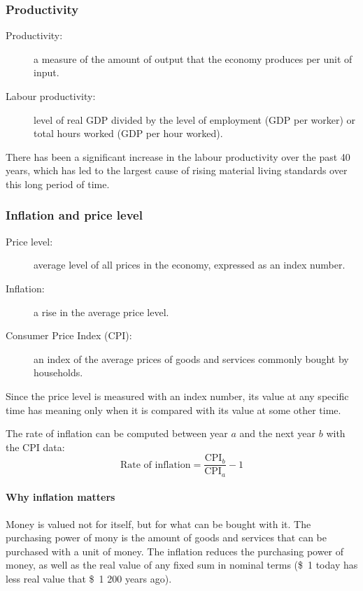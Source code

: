 \documentclass[10pt, twocolumn]{article}
\begin{document}
\subsubsection{Productivity}
\begin{description}
  \item[Productivity:] a measure of the amount of output that the economy produces per unit of input.
  \item[Labour productivity:] level of real GDP divided by the level of employment (GDP per worker) or total hours worked (GDP per hour worked).
\end{description}

There has been a significant increase in the labour productivity over the past 40 years, which has led to the largest cause of rising material living standards over this long period of time.


\subsubsection{Inflation and price level}
\begin{description}
  \item[Price level:] average level of all prices in the economy, expressed as an index number.
  \item[Inflation:] a rise in the average price level.
  \item[Consumer Price Index (CPI):] an index of the average prices of goods and services commonly bought by households.
\end{description}

\begin{remark}
  Since the price level is measured with an index number, its value at any specific time has meaning only when it is compared with its value at some other time.
\end{remark}

The rate of inflation can be computed between year \(a\) and the next year \(b\) with the CPI data:
\[
  \text{Rate of inflation} = \frac{\mathrm{CPI}_b}{\mathrm{CPI}_a} - 1
\]


\paragraph{Why inflation matters}
Money is valued not for itself, but for what can be bought with it.
The purchasing power of mony is the amount of goods and services that can be purchased with a unit of money.
The inflation reduces the purchasing power of money, as well as the real value of any fixed sum in nominal terms (\$~1 today has less real value that \$~1 200 years ago).
\end{document}
